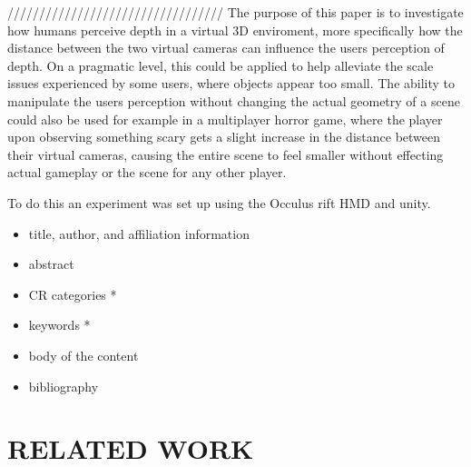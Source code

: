 \documentclass[tog]{acmsiggraph}
\begin{document}
//////////////////////////////////
The purpose of this paper is to investigate how humans perceive depth in a virtual 3D enviroment, more specifically how the distance between the two virtual cameras can influence the users perception of depth. On a pragmatic level, this could be applied to help alleviate the scale issues experienced by some users, where objects appear too small. The ability to manipulate the users perception without changing the actual geometry of a scene could also be used for example in a multiplayer horror game, where the player upon observing something scary gets a slight increase in the distance between their virtual cameras, causing the entire scene to feel smaller without effecting actual gameplay or the scene for any other player.    

To do this an experiment was set up using the Occulus rift HMD and unity.

\begin{itemize}
\item title, author, and affiliation information
\item abstract
\item CR categories *
\item keywords *
\item body of the content
\item bibliography
\end{itemize}



\section{RELATED WORK}
\end{document}
